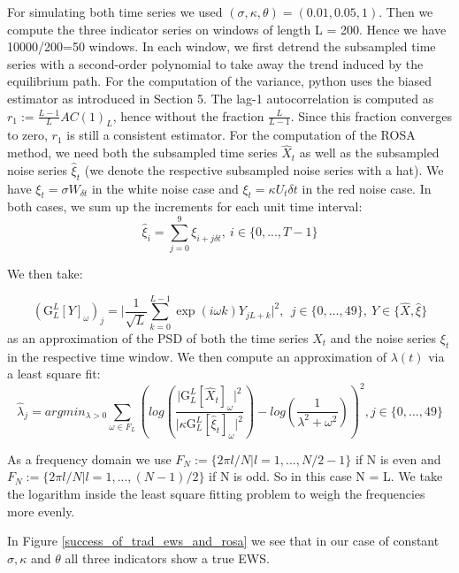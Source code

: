 \documentclass[%
thesis=student,%
coverpage=false,%
titlepage=false,%
headmarks=true, %
english,%
font=libertine, %
math=newpxtx, %
BCOR=5mm,%
coverBCOR=11mm%
]{tumbook}
\begin{document}
For simulating both time series we used $(\sigma,\kappa,\theta) = (0.01,0.05,1)$. 
Then we compute the three indicator series on windows of length L = 200. Hence we have 10000/200=50 windows. In each window, we first detrend the subsampled time series with a second-order polynomial to take away the trend induced by the equilibrium path. For the computation of the variance, python uses the biased estimator as introduced in Section 5. The lag-1 autocorrelation is computed as $r_{1} := \frac{L-1}{L}AC(1)_{L}$, hence without the fraction $\frac{L}{L-1}$. Since this fraction converges to zero, $r_{1}$ is still a consistent estimator. For the computation of the ROSA method, we need both the subsampled time series $\widehat{X}_{t}$ as well as the subsampled noise series $\widehat{\xi}_{t}$ (we denote the respective subsampled noise series with a hat). We have $\xi_{t} = \sigma W_{\delta t}$ in the white noise case and $\xi_{t} = \kappa U_{t} \delta t$ in the red noise case. In both cases, we sum up the increments for each unit time interval:
\[
\widehat{\xi}_{i} = \sum_{j = 0}^{9}\xi_{i+j\delta t}, \ i \in \{0,...,T-1\}
\]

We then take:

\[
(\mathrm{G}_{L}^{L}[Y]_{\omega})_{j} = \lvert \frac{1}{\sqrt{L}}\sum_{k=0}^{L-1}\exp(i\omega k)Y_{jL + k} \rvert ^2, \ \ j \in \{0,...,49\}, \ Y \in \{\widehat{X}, \widehat{\xi}\}
\]
as an approximation of the PSD of both the time series $X_{t}$ and the noise series $\xi_{t}$ in the respective time window. We then compute an approximation of $\lambda(t)$ via a least square fit:
\[
\widehat{\lambda}_{j} = argmin_{\lambda > 0} \sum_{\omega \in F_{L}} (log(\frac{\lvert \mathrm{G}_{L}^{L}[\widehat{X}_{t}]_{\omega}\rvert^2}{\lvert \kappa \mathrm{G}_{L}^{L}[\widehat{\xi}_{t}]_{\omega} \rvert^2}) - log(\frac{1}{\lambda^2 + \omega^2}))^2, j \in \{0,...,49\}
\]

As a frequency domain we use $F_{N}:=\{2\pi l/N | l = 1,...,N/2 - 1\}$ if N is even and $F_{N} := \{2\pi l/N | l = 1,...,(N-1)/2 \}$ if N is odd. So in this case N = L. We take the logarithm inside the least square fitting problem to weigh the frequencies more evenly. 

In Figure \ref{success_of_trad_ews_and_rosa} we see that in our case of constant $\sigma, \kappa$ and $\theta$ all three indicators show a true EWS.
\end{document}
